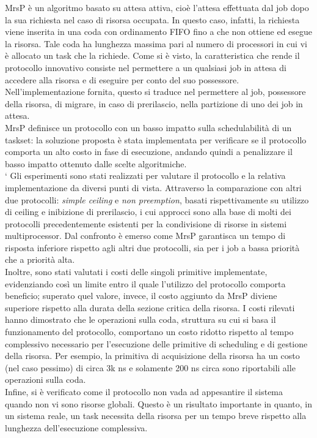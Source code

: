 MrsP è un algoritmo basato su attesa attiva, cioè l'attesa effettuata dal job dopo la sua richiesta nel caso di risorsa occupata. In questo caso, infatti, la richiesta viene inserita in una coda con ordinamento FIFO fino a che non ottiene ed esegue la risorsa. Tale coda ha lunghezza massima pari al numero di processori in cui vi è allocato un task che la richiede. Come si è visto, la caratteristica che rende il protocollo innovativo consiste nel permettere a un qualsiasi job in attesa di accedere alla risorsa e di eseguire per conto del suo possessore. Nell'implementazione fornita, questo si traduce nel permettere al job, possessore della risorsa, di migrare, in caso di prerilascio, nella partizione di uno dei job in attesa.\\
MrsP definisce un protocollo con un basso impatto sulla schedulabilità di un taskset: la soluzione proposta è stata implementata per verificare se il protocollo comporta un alto costo in fase di esecuzione, andando quindi a penalizzare il basso impatto ottenuto dalle scelte algoritmiche.\\
`
Gli esperimenti sono stati realizzati per valutare il protocollo e la relativa implementazione da diversi punti di vista. Attraverso la comparazione con altri due protocolli: \textit{simple ceiling} e \textit{non preemption}, basati rispettivamente su utilizzo di ceiling e inibizione di prerilascio, i cui approcci sono alla base di molti dei protocolli precedentemente esistenti per la condivisione di risorse in sistemi multiprocessor. Dal confronto è emerso come MrsP garantisca un tempo di risposta inferiore rispetto agli altri due protocolli, sia per i job a bassa priorità che a priorità alta.\\
Inoltre, sono stati valutati i costi delle singoli primitive implementate, evidenziando così un limite entro il quale l'utilizzo del protocollo comporta beneficio; superato quel valore, invece, il costo aggiunto da MrsP diviene superiore rispetto alla durata della sezione critica della risorsa. I costi rilevati hanno dimostrato che le operazioni sulla coda, struttura su cui si basa il funzionamento del protocollo, comportano un costo ridotto rispetto al tempo complessivo necessario per l'esecuzione delle primitive di scheduling e di gestione della risorsa. Per esempio, la primitiva di acquisizione della risorsa ha un costo (nel caso pessimo) di circa 3k ns e solamente 200 ns circa sono riportabili alle operazioni sulla coda.\\
Infine, si è verificato come il protocollo non vada ad appesantire il sistema quando non vi sono risorse globali. Questo è un risultato importante in quanto, in un sistema reale, un task necessita della risorsa per un tempo breve rispetto alla lunghezza dell'esecuzione complessiva.\\

